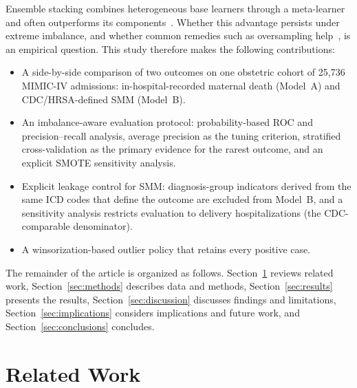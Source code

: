 \documentclass[healthcare,article,submit,pdftex,moreauthors]{Definitions/mdpi}
\begin{document}
Ensemble stacking combines heterogeneous base learners through a meta-learner and
often outperforms its components~\cite{Wolpert1992Stacking,Hastie2009ESL}. Whether
this advantage persists under extreme imbalance, and whether common remedies such as
oversampling help~\cite{vandenGoorbergh2022Harm}, is an empirical question.
This study therefore makes the following contributions:
\begin{itemize}[leftmargin=*,labelsep=5.8mm]
  \item A side-by-side comparison of two outcomes on one obstetric cohort of
        25{,}736 MIMIC-IV admissions: in-hospital-recorded maternal death
        (Model~A) and CDC/HRSA-defined SMM (Model~B).
  \item An imbalance-aware evaluation protocol: probability-based ROC and
        precision--recall analysis, average precision as the tuning criterion,
        stratified cross-validation as the primary evidence for the rarest outcome,
        and an explicit SMOTE sensitivity analysis.
  \item Explicit leakage control for SMM: diagnosis-group indicators derived from
        the same ICD codes that define the outcome are excluded from Model~B, and a
        sensitivity analysis restricts evaluation to delivery hospitalizations
        (the CDC-comparable denominator).
  \item A winsorization-based outlier policy that retains every positive case.
\end{itemize}
The remainder of the article is organized as follows. Section~\ref{sec:related}
reviews related work, Section~\ref{sec:methods} describes data and methods,
Section~\ref{sec:results} presents the results, Section~\ref{sec:discussion} discusses
findings and limitations, Section~\ref{sec:implications} considers implications and
future work, and Section~\ref{sec:conclusions} concludes.

\section{Related Work}\label{sec:related}
\end{document}
